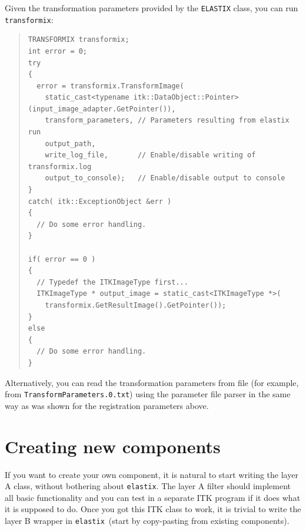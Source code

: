 \documentclass[]{report}
\newcommand{\elastix}{\texttt{elastix}}
\newcommand{\transformix}{\texttt{transformix}}
\begin{document}
Given the transformation parameters provided by the \texttt{ELASTIX}
class, you can run \transformix:
\begin{quote}
\begin{verbatim}
TRANSFORMIX transformix;
int error = 0;
try
{
  error = transformix.TransformImage(
    static_cast<typename itk::DataObject::Pointer>(input_image_adapter.GetPointer()),
    transform_parameters, // Parameters resulting from elastix run
    output_path,
    write_log_file,       // Enable/disable writing of transformix.log
    output_to_console);   // Enable/disable output to console
}
catch( itk::ExceptionObject &err )
{
  // Do some error handling.
}

if( error == 0 )
{
  // Typedef the ITKImageType first...
  ITKImageType * output_image = static_cast<ITKImageType *>(
    transformix.GetResultImage().GetPointer());
}
else
{
  // Do some error handling.
}

\end{verbatim}
\end{quote}
Alternatively, you can read the transformation parameters from file
(for example, from \texttt{TransformParameters.0.txt}) using the
parameter file parser in the same way as was shown for the
registration parameters above.

\section{Creating new components}\label{sec:dev:newcomp}

If you want to create your own component, it is natural to start writing the
layer A class, without bothering about \elastix. The layer A filter should
implement all basic functionality and you can test in a separate ITK program if
it does what it is supposed to do. Once you got this ITK class to work, it is
trivial to write the layer B wrapper in \elastix\ (start by copy-pasting from
existing components).
\end{document}
